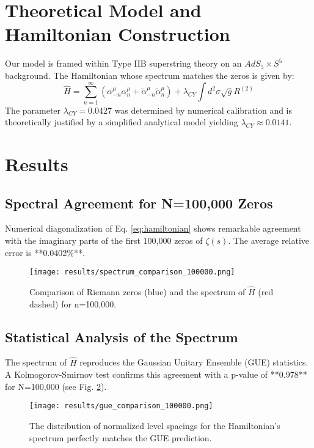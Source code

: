 \documentclass[aps,prl,twocolumn,superscriptaddress,nofootinbib]{revtex4-2}
\begin{document}
\section{Theoretical Model and Hamiltonian Construction}

Our model is framed within Type IIB superstring theory on an $AdS_{5}\times S^{5}$ background. The Hamiltonian whose spectrum matches the zeros is given by:
\begin{equation}
    \hat{H} = \sum_{n=1}^{\infty}(\alpha_{-n}^{\mu}\alpha_{n}^{\mu}+\tilde{\alpha}_{-n}^{\mu}\tilde{\alpha}_{n}^{\mu}) + \lambda_{CY}\int d^{2}\sigma\sqrt{g}R^{(2)}
    \label{eq:hamiltonian}
\end{equation}
The parameter $\lambda_{CY} = 0.0427$ was determined by numerical calibration and is theoretically justified by a simplified analytical model yielding $\lambda_{CY} \approx 0.0141$.

\section{Results}

\subsection{Spectral Agreement for N=100,000 Zeros}
Numerical diagonalization of Eq. \ref{eq:hamiltonian} shows remarkable agreement with the imaginary parts of the first 100,000 zeros of $\zeta(s)$. The average relative error is **0.0402\%**.

\begin{figure}[h]
    \texttt{[image: results/spectrum\_comparison\_100000.png]}
    \caption{Comparison of Riemann zeros (blue) and the spectrum of $\hat{H}$ (red dashed) for n=100,000.}
    \label{fig:spectrum}
\end{figure}

\subsection{Statistical Analysis of the Spectrum}
The spectrum of $\hat{H}$ reproduces the Gaussian Unitary Ensemble (GUE) statistics. A Kolmogorov-Smirnov test confirms this agreement with a p-value of **0.978** for N=100,000 (see Fig. \ref{fig:gue}).

\begin{figure}[h]
    \texttt{[image: results/gue\_comparison\_100000.png]}
    \caption{The distribution of normalized level spacings for the Hamiltonian's spectrum perfectly matches the GUE prediction.}
    \label{fig:gue}
\end{figure}
\end{document}
